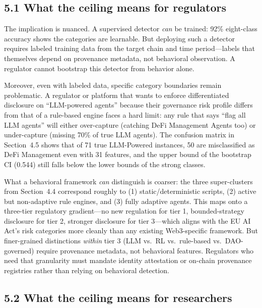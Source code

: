 \documentclass[sigconf,nonacm=false]{acmart}
\begin{document}
\subsection{5.1 What the ceiling means for regulators}

The implication is nuanced. A supervised detector \emph{can} be trained: 92\% eight-class accuracy shows the categories are learnable. But deploying such a detector requires labeled training data from the target chain and time period---labels that themselves depend on provenance metadata, not behavioral observation. A regulator cannot bootstrap this detector from behavior alone.

Moreover, even with labeled data, specific category boundaries remain problematic. A regulator or platform that wants to enforce differentiated disclosure on ``LLM-powered agents'' because their governance risk profile differs from that of a rule-based engine faces a hard limit: any rule that says ``flag all LLM agents'' will either over-capture (catching DeFi Management Agents too) or under-capture (missing 70\% of true LLM agents). The confusion matrix in Section~4.5 shows that of 71 true LLM-Powered instances, 50 are misclassified as DeFi Management even with 31 features, and the upper bound of the bootstrap CI (0.544) still falls below the lower bounds of the strong classes.

What a behavioral framework \emph{can} distinguish is coarser: the three super-clusters from Section~4.4 correspond roughly to (1) static/deterministic scripts, (2) active but non-adaptive rule engines, and (3) fully adaptive agents. This maps onto a three-tier regulatory gradient---no new regulation for tier 1, bounded-strategy disclosure for tier 2, stronger disclosure for tier 3---which aligns with the EU AI Act's risk categories more cleanly than any existing Web3-specific framework. But finer-grained distinctions \emph{within} tier 3 (LLM vs.\ RL vs.\ rule-based vs.\ DAO-governed) require provenance metadata, not behavioral features. Regulators who need that granularity must mandate identity attestation or on-chain provenance registries rather than relying on behavioral detection.

\subsection{5.2 What the ceiling means for researchers}
\end{document}
